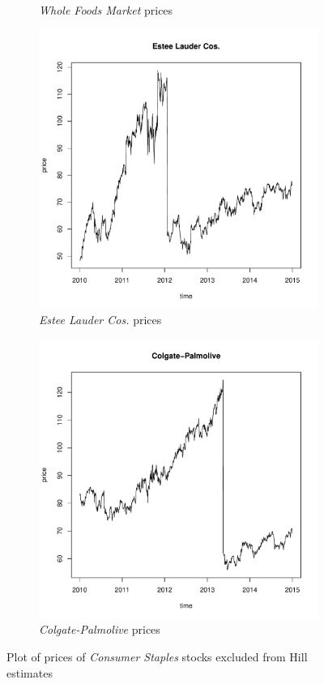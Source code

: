 \documentclass{article}
\newcommand{\1}[1]{
  \mathbf{1}_{\{#1\}}
}
\begin{document}
\begin{figure}[htb!]
\begin{subfigure}{0.45\textwidth}
    \caption{{\it Whole Foods Market} prices}
    \label{fig:WFM_prices}
  \end{subfigure}
  \begin{subfigure}{0.45\textwidth}
    \includegraphics[width=\textwidth]{EL_price.pdf}
    \caption{{\it Estee Lauder Cos.} prices}    
    \label{fig:EL_prices}
  \end{subfigure}
  \begin{subfigure}{0.45\textwidth}
    \includegraphics[width=\textwidth]{CL_price.pdf}
    \caption{{\it Colgate-Palmolive} prices}    
    \label{fig:CL_prices}
  \end{subfigure}
  \caption{Plot of prices of {\it Consumer Staples} stocks
    excluded from Hill estimates}
\end{figure}
\end{document}
